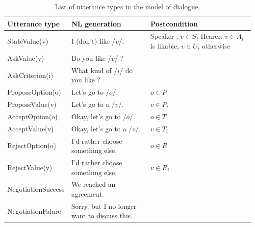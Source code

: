 \documentclass{llncs}
\begin{document}
		\begin{table}[t]
			{\scriptsize
				\begin{tabular} {|p{2.75cm}|p{4cm}|p{3cm}|}
					\hline
					\textbf{Utterance type}  &\textbf{ NL generation} & \textbf{Postcondition}\\
					\hline
					StateValue(v) &  I (don't) like /$v$/. & Speaker : $v \in S_i$ \newline Hearer:  \newline $v\in A_i$ is likable, $v\in U_i$ otherwise \\
					\hline
					AskValue(v)& Do you like /$v$/ ? & \multirow{2}{*}{} \\
					
					AskCriterion(i) &  What kind of /$i$/ do you like ? & \\
					\hline
					ProposeOption(o)  & Let's go to /$o$/. & $o \in P$\\
					
					ProposeValue(v) & Let's go to a /$v$/. & $v \in P_i$\\
					\hline
					AcceptOption(o)& Okay, let's go to /$o$/.& $o \in T$ \\
					
					AcceptValue(v) & Okay, let's go to a /$v$/.& $v \in T_i$ \\
					\hline
					RejectOption(o) & I'd rather choose  something else. & $o \in R$\\
					
					RejectValue(v) &  I'd rather choose  something else. & $v \in R_i$ \\
					\hline
					NegotiationSuccess &  We reached an agreement. & \multirow{2}{*}{}\\
					\cline{1-2}
					NegotiationFalure &  Sorry, but I no longer want to discuss this. & \\
					\hline
				\end{tabular}
			}
			\caption{\label{table:utt}List of utterance types in the model of dialogue.}
		\end{table}
		
\end{document}
